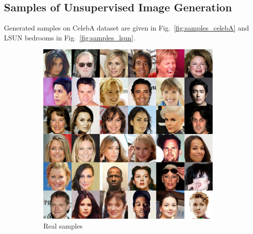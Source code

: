 \documentclass{article} %
\theoremstyle{plain}
\newtheorem*{proposition 1*}{Proposition 1}
\begin{document}
\begin{appendices}
\subsection{Samples of Unsupervised Image Generation}
\label{sec:uns_samples}

Generated samples on CelebA dataset are given in Fig.~\ref{fig:samples_celebA} and LSUN bedrooms in Fig.~\ref{fig:samples_lsun}.

\begin{figure}[tb]
	\centering
	\begin{subfigure}[t]{0.45\textwidth}
		\centering
		\includegraphics[width=1\textwidth]{celebA_real.png}
		\caption{Real samples\label{fig:sample_celebA_real}}
	\end{subfigure}
	~
	\begin{subfigure}[t]{0.45\linewidth}
		\centering

\end{subfigure}
\end{figure}
\end{appendices}
\end{document}
